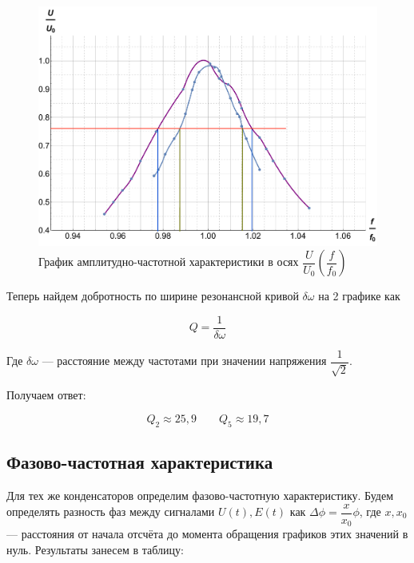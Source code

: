 \documentclass[a4paper, 12pt]{article}
\begin{document}
            \begin{figure}[h!]
                \includegraphics[scale=0.5]{img/fff.pdf}
                \caption{График амплитудно-частотной характеристики в осях $ \dfrac{U}{U_0} \left( \dfrac{f}{f_0} \right) $ }
            \end{figure}

            Теперь найдем добротность по ширине резонансной кривой $ \delta\omega $ на 2 графике как

            \begin{equation}\label{}
            Q = \dfrac{1}{\delta\omega}
            \end{equation}

            Где $ \delta\omega $ --- расстояние между частотами при значении напряжения $ \dfrac{1}{\sqrt{2}} $.

            Получаем ответ:

            \begin{equation}\label{}
            Q_2 \approx 25,9 \qquad Q_5 \approx 19,7
            \end{equation}

        \subsection{Фазово-частотная характеристика}

            Для тех же конденсаторов определим фазово-частотную характеристику. Будем определять разность фаз между сигналами $ U(t), E(t) $ как $ \Delta\phi = \dfrac{x}{x_0}\phi $, где $ x, x_0 $ --- расстояния от начала отсчёта до момента обращения графиков этих значений в нуль. Результаты занесем в таблицу:
\end{document}
